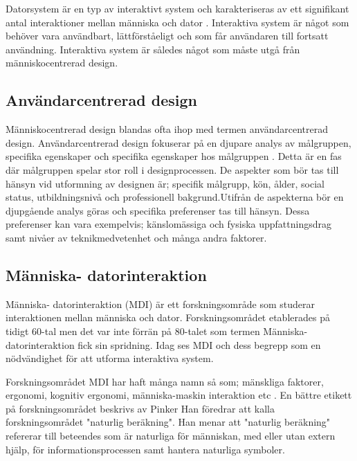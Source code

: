 Datorsystem är en typ av interaktivt system och karakteriseras av ett signifikant antal interaktioner mellan människa och dator \cite{InteractiveDictionary}. Interaktiva system är något som behöver vara användbart, lättförståeligt och som får användaren till fortsatt användning\cite{May2012ApplyingApp}. Interaktiva system är således något som måste utgå från människocentrerad design\cite{Human-CenteredStudio}. 

\subsection{Användarcentrerad design}

Människocentrerad design blandas ofta ihop med termen användarcentrerad design\cite{Abras2004User-CenteredDesign}. Användarcentrerad design fokuserar på en djupare analys av målgruppen, specifika egenskaper och specifika egenskaper hos målgruppen . Detta är en fas där målgruppen spelar stor roll i designprocessen. De aspekter som bör tas till hänsyn vid utformning av designen är; specifik målgrupp, kön, ålder, social status, utbildningsnivå och professionell bakgrund\cite{Human-CenteredStudiob}.Utifrån de aspekterna bör en djupgående analys göras och specifika preferenser tas till hänsyn. Dessa preferenser kan vara exempelvis; känslomässiga och fysiska uppfattningsdrag samt nivåer av teknikmedvetenhet och många andra faktorer\cite{Human-CenteredStudiob}. 
\newline

\subsection{Människa- datorinteraktion}

Människa- datorinteraktion (MDI) är ett forskningsområde som studerar interaktionen mellan människa och dator\cite{Blanton2009Human-ComputerInteraction}. Forskningsområdet etablerades på tidigt 60-tal men det var inte förrän på 80-talet som termen Människa- datorinteraktion fick sin spridning\cite{Myers1998ATechnology}. Idag ses MDI och dess begrepp som en nödvändighet för att utforma interaktiva system\cite{TheCambridge}. 
\newline

Forskningsområdet MDI har haft många namn så som; mänskliga faktorer, ergonomi, kognitiv ergonomi, människa-maskin interaktion etc \cite{Smith-Atakan2006Human-computerInteraction}. En bättre etikett på forskningsområdet beskrivs av Pinker \cite{Langendoen1999HowWorks} Han föredrar att kalla forskningsområdet "naturlig beräkning". Han menar att "naturlig beräkning" refererar till beteendes som är naturliga för människan, med eller utan extern hjälp, för informationsprocessen samt hantera naturliga symboler.  
 
